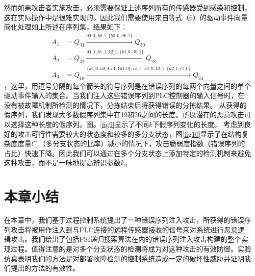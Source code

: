 然而如果攻击者实施攻击，必须需要保证上述序列所有的传感器受到感染和控制，这在实际操作中是很难实现的。因此我们需要使用来自等式（6）的驱动事件向量简化处理如上所述在序列集，结果如下：\[\begin{split} A_1&=Q_{34}\xrightarrow{d1\_1,b0\_1,\{b0\_0,d0\_1\}}Q_{30}\\A_2&=Q_{32}\xrightarrow{d1\_1,b1\_1,k2\_1,\{b1\_0,d0\_1\}}Q_{28}\\A_3&=Q_{16}\xrightarrow{\{k1\_0,a0\_0,c1\_1d1\_0\},a1\_1,a1\_0,k2\_1,\{a2\_1,c1\_0\}}Q_{34} \end{split}\]，这里，用逗号分隔的每个箭头的符号序列是在错误序列的每两个向量之间的单个驱动事件输入的集合。当我们注入这些错误序列到PLC控制器的输入信号时，在没有被故障机制所检测的情况下，分拣结束后将获得错误的分拣结果。
从获得的假序列，我们发现大多数假序列集中在19和26之间的长度。所以潜在的恶意攻击可以选择这种长度的假序列。图。\ref{fig9}显示了不同$ k $下假序列变化的长度。
考虑到良好的攻击可行性需要较大的状态度和较多的多分支状态，图\ref{fig10}显示了在结构复杂度度量$ C_s $（多分支状态的比率）减小的情况下，攻击脆弱度指数（错误序列的占比）快速下降。因此我们可以通过在多个分支状态上添加特定的检测机制来避免这种攻击，而不是一味地提高辨识参数$ k $。

\section{本章小结}

在本章中，我们基于过程控制系统提出了一种错误序列注入攻击，所获得的错误序列攻击将被用作注入到与PLC连接的远程传感器接收的信号来对系统进行恶意逻辑攻击。我们给出了包括FSI递归搜索算法在内的错误序列注入攻击构建的整个实现过程。值得注意的是对多个分支状态的检测将成为对这种攻击的有效防御。实验仿真表明我们的方法是对部署故障检测的控制系统造成一定的破坏性威胁并证明我们提出的方法的有效性。

\label{sec:insertimage}


